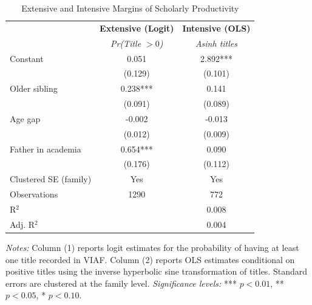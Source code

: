 \begin{table}[H]
\centering
\caption{Extensive and Intensive Margins of Scholarly Productivity}
\label{tab:extensive_intensive}

\begin{tablebody}
\begin{tabular}{l c c}
\toprule
 & \textbf{Extensive (Logit)} & \textbf{Intensive (OLS)} \\
 & \textit{Pr(Title $>0$)} & \textit{Asinh titles} \\
\midrule

Constant
& 0.051 & 2.892*** \\
& (0.129) & (0.101) \\

Older sibling
& 0.238*** & 0.141 \\
& (0.091) & (0.089) \\

Age gap
& -0.002 & -0.013 \\
& (0.012) & (0.009) \\

Father in academia
& 0.654*** & 0.090 \\
& (0.176) & (0.112) \\

\midrule
Clustered SE (family) & Yes & Yes \\
\midrule
Observations & 1290 & 772 \\
R$^{2}$ &  & 0.008 \\
Adj. R$^{2}$ &  & 0.004 \\
\bottomrule
\end{tabular}
\end{tablebody}

\vspace{4pt}
\begin{minipage}{\textwidth}
\footnotesize
\textit{Notes:} Column (1) reports logit estimates for the probability of having at least one title recorded in VIAF. Column (2) reports OLS estimates conditional on positive titles using the inverse hyperbolic sine transformation of titles. Standard errors are clustered at the family level. \textit{Significance levels:} *** $p<0.01$, ** $p<0.05$, * $p<0.10$.
\end{minipage}

\end{table}